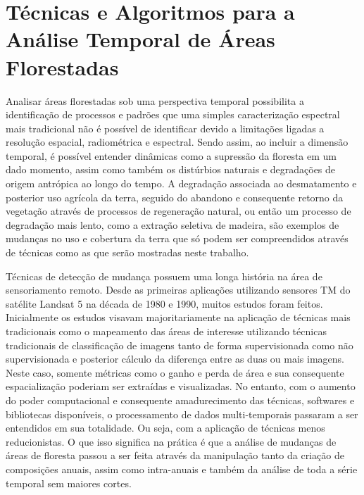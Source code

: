 \documentclass[twocolumn]{article}
\begin{document}
\section{Técnicas e Algoritmos para a Análise Temporal de Áreas Florestadas}
Analisar áreas florestadas sob uma perspectiva temporal possibilita a identificação de processos e padrões que uma simples caracterização espectral mais tradicional não é possível de identificar devido a limitações ligadas a resolução espacial, radiométrica e espectral. Sendo assim, ao incluir a dimensão temporal, é possível entender dinâmicas como a supressão da floresta em um dado momento, assim como também os distúrbios naturais e degradações de origem antrópica ao longo do tempo.
A degradação associada ao desmatamento e posterior uso agrícola da terra, seguido do abandono e consequente retorno da vegetação através de processos de regeneração natural, ou então um processo de degradação mais lento, como a extração seletiva de madeira, são exemplos de mudanças no uso e cobertura da terra que só podem ser compreendidos através de técnicas como as que serão mostradas neste trabalho. 
\par
Técnicas de detecção de mudança possuem uma longa história na área de sensoriamento remoto. Desde as primeiras aplicações utilizando sensores TM do satélite Landsat 5 na década de 1980 e 1990, muitos estudos foram feitos. Inicialmente os estudos visavam majoritariamente na aplicação de técnicas mais tradicionais como o mapeamento das áreas de interesse utilizando técnicas tradicionais de classificação de imagens tanto de forma supervisionada como não supervisionada e posterior cálculo da diferença entre as duas ou mais imagens. Neste caso, somente métricas como o ganho e perda de área e sua consequente espacialização poderiam ser extraídas e visualizadas. No entanto, com o aumento do poder computacional e consequente amadurecimento das técnicas, softwares e bibliotecas disponíveis, o processamento de dados multi-temporais passaram a ser entendidos em sua totalidade. Ou seja, com a aplicação de técnicas menos reducionistas. O que isso significa na prática é que a análise de mudanças de áreas de floresta passou a ser feita através da manipulação tanto da criação de composições anuais, assim como intra-anuais e também da análise de toda a série temporal sem maiores cortes.
\par
\end{document}
